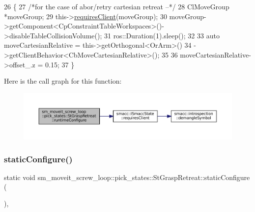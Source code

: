 \begin{DoxyCode}
26     \{
27         \textcolor{comment}{/*for the case of abor/retry cartesian retreat --*/}
28         ClMoveGroup *moveGroup;
29         this->\hyperlink{classsmacc_1_1ISmaccState_a7f95c9f0a6ea2d6f18d1aec0519de4ac}{requiresClient}(moveGroup);
30         moveGroup->getComponent<CpConstraintTableWorkspaces>()->disableTableCollisionVolume();
31         ros::Duration(1).sleep();
32 
33         \textcolor{keyword}{auto} moveCartesianRelative = this->getOrthogonal<OrArm>()
34                                          ->getClientBehavior<CbMoveCartesianRelative>();
35 
36         moveCartesianRelative->offset\_.z = 0.15;
37     \}
\end{DoxyCode}
Here is the call graph for this function\+:
\nopagebreak
\begin{figure}[H]
\begin{center}
\leavevmode
\includegraphics[width=350pt]{structsm__moveit__screw__loop_1_1pick__states_1_1StGraspRetreat_adef9788db110e34f972fd4dddf4a4cff_cgraph}
\end{center}
\end{figure}
\mbox{\label{structsm__moveit__screw__loop_1_1pick__states_1_1StGraspRetreat_abdf170f05ced80b9465726760df3f76d}} 
\subsubsection{\texorpdfstring{static\+Configure()}{staticConfigure()}}
{\footnotesize\ttfamily static void sm\+\_\+moveit\+\_\+screw\+\_\+loop\+::pick\+\_\+states\+::\+St\+Grasp\+Retreat\+::static\+Configure (\begin{DoxyParamCaption}{ }\end{DoxyParamCaption})\hspace{0.3cm}{\ttfamily [inline]}, {\ttfamily [static]}}




